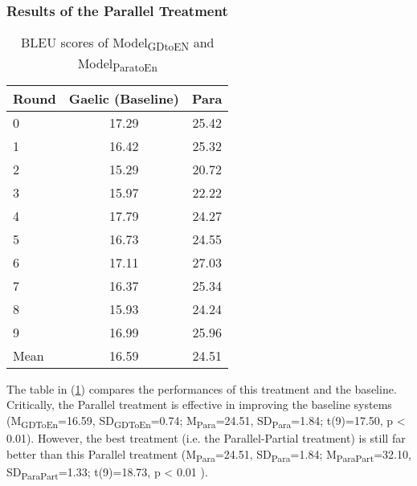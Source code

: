\documentclass[final]{ua-thesis}
\numberwithin{equation}{section}
\begin{document}
\subsubsection{Results of the Parallel Treatment}\label{treatment:Para_result}
\begin{table}[ht]
\centering
\begin{tabular}{lcc}
  \hline
Round & Gaelic (Baseline) & Para \\ 
  \hline
0 & 17.29 & 25.42 \\ 
  1 & 16.42 & 25.32 \\ 
  2 & 15.29 & 20.72 \\ 
  3 & 15.97 & 22.22 \\ 
  4 & 17.79 & 24.27 \\ 
  5 & 16.73 & 24.55 \\ 
  6 & 17.11 & 27.03 \\ 
  7 & 16.37 & 25.34 \\ 
  8 & 15.93 & 24.24 \\ 
  9 & 16.99 & 25.96 \\ 
   \hline
Mean & 16.59 & 24.51 \\ 
   \hline
\end{tabular}
\caption{BLEU scores of Model\textsubscript{GDtoEN} and Model\textsubscript{ParatoEn}} 
\label{Table:Para}
\end{table}The table in (\ref{Table:Para}) compares the performances of this treatment and the baseline. Critically, the Parallel treatment is effective in improving the baseline systems (M\textsubscript{GDToEn}=16.59, SD\textsubscript{GDToEn}=0.74; M\textsubscript{Para}=24.51, SD\textsubscript{Para}=1.84; t(9)=17.50, p < 0.01). 
However, the best treatment (i.e. the Parallel-Partial treatment) is still far better than this Parallel treatment 
(M\textsubscript{Para}=24.51, SD\textsubscript{Para}=1.84; M\textsubscript{ParaPart}=32.10, SD\textsubscript{ParaPart}=1.33; t(9)=18.73, p < 0.01 ).
\end{document}
